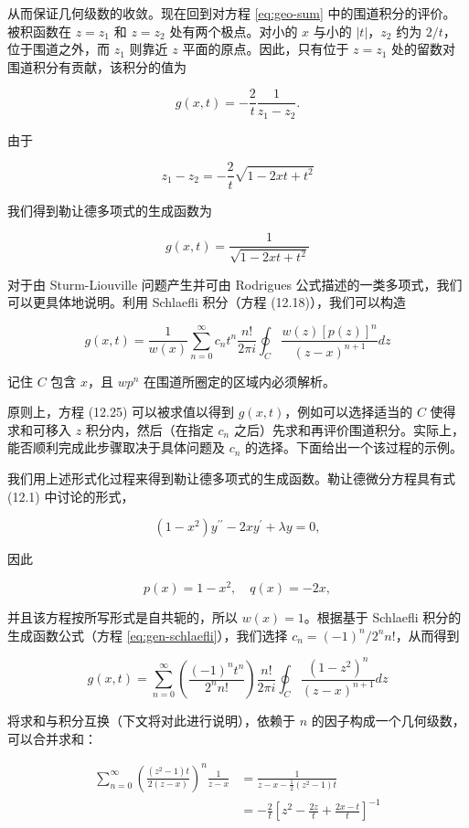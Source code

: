 从而保证几何级数的收敛。现在回到对方程 \eqref{eq:geo-sum} 中的围道积分的评价。被积函数在 $z=z_1$ 和 $z=z_2$ 处有两个极点。对小的 $x$ 与小的 $|t|$，$z_2$ 约为 $2/t$，位于围道之外，而 $z_1$ 则靠近 $z$ 平面的原点。因此，只有位于 $z=z_1$ 处的留数对围道积分有贡献，该积分的值为

$$
g(x, t)=-\frac{2}{t} \frac{1}{z_1-z_2} .
$$

由于

$$
z_1-z_2=-\frac{2}{t} \sqrt{1-2 x t+t^2}
$$

我们得到勒让德多项式的生成函数为

$$
g(x, t)=\frac{1}{\sqrt{1-2 x t+t^2}}
$$

对于由 Sturm-Liouville 问题产生并可由 Rodrigues 公式描述的一类多项式，我们可以更具体地说明。利用 Schlaefli 积分（方程 (12.18)），我们可以构造

$$
g(x, t)=\frac{1}{w(x)} \sum_{n=0}^{\infty} c_n t^n \frac{n!}{2 \pi i} \oint_C \frac{w(z)[p(z)]^n}{(z-x)^{n+1}} d z
$$

记住 $C$ 包含 $x$，且 $w p^n$ 在围道所圈定的区域内必须解析。

原则上，方程 (12.25) 可以被求值以得到 $g(x,t)$，例如可以选择适当的 $C$ 使得求和可移入 $z$ 积分内，然后（在指定 $c_n$ 之后）先求和再评价围道积分。实际上，能否顺利完成此步骤取决于具体问题及 $c_n$ 的选择。下面给出一个该过程的示例。

我们用上述形式化过程来得到勒让德多项式的生成函数。勒让德微分方程具有式 (12.1) 中讨论的形式，

$$
\left(1-x^2\right) y^{\prime \prime}-2 x y^{\prime}+\lambda y=0,
$$

因此

$$
p(x)=1-x^2, \quad q(x)=-2 x,
$$

并且该方程按所写形式是自共轭的，所以 $w(x)=1$。根据基于 Schlaefli 积分的生成函数公式（方程 \eqref{eq:gen-schlaefli}），我们选择 $c_n=(-1)^n / 2^n n!$，从而得到

$$
g(x, t)=\sum_{n=0}^{\infty}\left(\frac{(-1)^n t^n}{2^n n!}\right) \frac{n!}{2 \pi i} \oint_C \frac{\left(1-z^2\right)^n}{(z-x)^{n+1}} d z
$$

将求和与积分互换（下文将对此进行说明），依赖于 $n$ 的因子构成一个几何级数，可以合并求和：

$$
\begin{aligned}
\sum_{n=0}^{\infty}\left(\frac{\left(z^2-1\right) t}{2(z-x)}\right)^n \frac{1}{z-x} & =\frac{1}{z-x-\frac{1}{2}\left(z^2-1\right) t} \\
& =-\frac{2}{t}\left[z^2-\frac{2 z}{t}+\frac{2 x-t}{t}\right]^{-1}
\end{aligned}
$$

